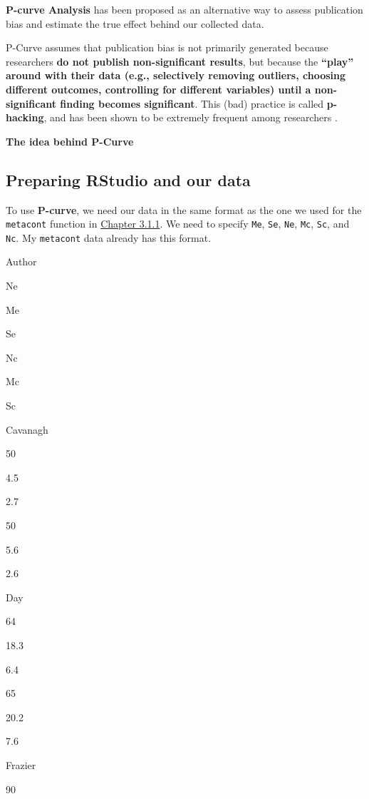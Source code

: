 \documentclass[]{book}
\begin{document}
\textbf{P-curve Analysis} has been proposed as an alternative way to assess publication bias and estimate the true effect behind our collected data.

P-Curve assumes that publication bias is not primarily generated because researchers \textbf{do not publish non-significant results}, but because the \textbf{``play'' around with their data (e.g., selectively removing outliers, choosing different outcomes, controlling for different variables) until a non-significant finding becomes significant}. This (bad) practice is called \textbf{p-hacking}, and has been shown to be extremely frequent among researchers \citep{head2015extent}.

\begin{rmdinfo}
\textbf{The idea behind P-Curve}
\end{rmdinfo}

\hypertarget{preparing-rstudio-and-our-data}{%
\subsection{Preparing RStudio and our data}\label{preparing-rstudio-and-our-data}}

To use \textbf{P-curve}, we need our data in the same format as the one we used for the \texttt{metacont} function in \protect\hyperlink{excel_preparation}{Chapter 3.1.1}. We need to specify \texttt{Me}, \texttt{Se}, \texttt{Ne}, \texttt{Mc}, \texttt{Sc}, and \texttt{Nc}. My \texttt{metacont} data already has this format.

Author

Ne

Me

Se

Nc

Mc

Sc

Cavanagh

50

4.5

2.7

50

5.6

2.6

Day

64

18.3

6.4

65

20.2

7.6

Frazier

90
\end{document}

